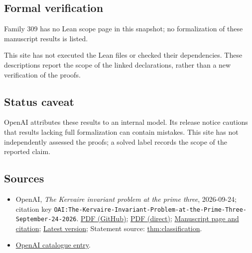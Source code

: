 \documentclass[11pt]{article}
\begin{document}
\subsection{Formal verification}
Family 309 has no Lean scope page in this snapshot; no formalization of these manuscript results is listed.

This site has not executed the Lean files or checked their dependencies. These descriptions report the scope of the linked declarations, rather than a new verification of the proofs.

\subsection{Status caveat}
OpenAI attributes these results to an internal model. Its release notice cautions that results lacking full formalization can contain mistakes. This site has not independently assessed the proofs; a solved label records the scope of the reported claim.

\subsection{Sources}
\begin{itemize}
\item OpenAI, \emph{The Kervaire invariant problem at the prime three}, 2026-09-24; citation key \texttt{OAI:The-Kervaire-Invariant-Problem-at-the-Prime-Three-September-24-2026}. \href{https://github.com/openai/math/blob/adc7f1241b42e322a6451854ab7e4b4c146bf78a/preprints/The-Kervaire-Invariant-Problem-at-the-Prime-Three-September-24-2026/paper.pdf}{PDF (GitHub)}; \href{https://github.com/openai/math/raw/adc7f1241b42e322a6451854ab7e4b4c146bf78a/preprints/The-Kervaire-Invariant-Problem-at-the-Prime-Three-September-24-2026/paper.pdf}{PDF (direct)}; \href{https://github.com/openai/math/blob/adc7f1241b42e322a6451854ab7e4b4c146bf78a/preprints/The-Kervaire-Invariant-Problem-at-the-Prime-Three-September-24-2026/README.md}{Manuscript page and citation}; \href{https://github.com/openai/math/blob/main/preprints/The-Kervaire-Invariant-Problem-at-the-Prime-Three-September-24-2026/paper.pdf}{Latest version}; Statement source: \href{https://github.com/openai/math/blob/adc7f1241b42e322a6451854ab7e4b4c146bf78a/preprints/The-Kervaire-Invariant-Problem-at-the-Prime-Three-September-24-2026/build/sections/introduction.tex\#L24}{thm:classification}.
\item \href{https://github.com/openai/math/blob/adc7f1241b42e322a6451854ab7e4b4c146bf78a/CONTENTS.md}{OpenAI catalogue entry}.
\end{itemize}
\end{document}
